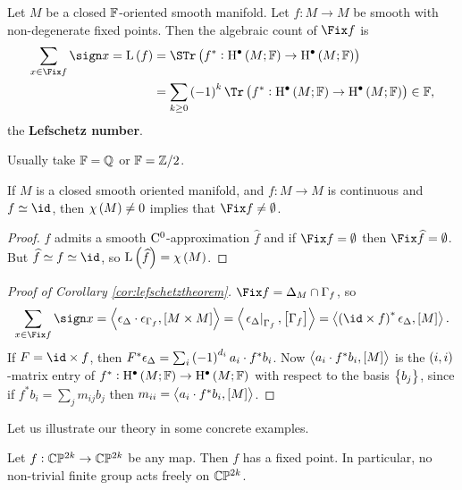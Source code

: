 \begin{corollary}
\label{cor:lefschetztheorem}
Let $ M $ be a closed $ \mathbb{F} $-oriented smooth manifold. Let $ f : M \to M $ be smooth with non-degenerate fixed points. Then the algebraic count of $ \Fix f $ is
\begin{align*}
\sum_{x \in \Fix f} \sign x
= \L\br{f}
& = \STr \br{f^* : \H^\bullet\br{M; \FF} \to \H^\bullet\br{M; \FF}} \\
& = \sum_{k \ge 0} \br{-1}^k\Tr \br{f^* : \H^\bullet\br{M; \FF} \to \H^\bullet\br{M; \FF}}
\in \FF,
\end{align*}
the \textbf{Lefschetz number}.
\end{corollary}

Usually take $ \mathbb{F} = \mathbb{Q} $ or $ \mathbb{F} = \mathbb{Z} / 2 $.

\begin{corollary}
If $ M $ is a closed smooth oriented manifold, and $ f : M \to M $ is continuous and $ f \simeq \id $, then $ \chi\br{M} \ne 0 $ implies that $ \Fix f \ne \emptyset $.
\end{corollary}

\begin{proof}
$ f $ admits a smooth $ \mathrm{C}^0 $-approximation $ \widehat{f} $ and if $ \Fix f = \emptyset $ then $ \Fix \widehat{f} = \emptyset $. But $ \widehat{f} \simeq f \simeq \id $, so $ \L\br{\widehat{f}} = \chi\br{M} $.
\end{proof}

\pagebreak

\begin{proof}[Proof of Corollary \ref{cor:lefschetztheorem}]
$ \Fix f = \Delta_M \cap \Gamma_f $, so
$$ \sum_{x \in \Fix f} \sign x = \abr{\epsilon_\Delta \cdot \epsilon_{\Gamma_f}, \sbr{M \times M}} = \abr{\eval{\epsilon_\Delta}_{\Gamma_f}, \sbr{\Gamma_f}} = \abr{\br{\id \times f}^*\epsilon_\Delta, \sbr{M}}. $$
If $ F = \id \times f $, then $ F^*\epsilon_\Delta = \sum_i \br{-1}^{d_i}a_i \cdot f^*b_i $. Now $ \abr{a_i \cdot f^*b_i, \sbr{M}} $ is the $ \br{i, i} $-matrix entry of $ f^* : \H^\bullet\br{M; \FF} \to \H^\bullet\br{M; \FF} $ with respect to the basis $ \cbr{b_j} $, since if $ f^*b_i = \sum_j m_{ij}b_j $ then $ m_{ii} = \abr{a_i \cdot f^*b_i, \sbr{M}} $.
\end{proof}


Let us illustrate our theory in some concrete examples.

\begin{corollary}
Let $ f : \mathbb{C}\mathbb{P}^{2k} \to \mathbb{C}\mathbb{P}^{2k} $ be any map. Then $ f $ has a fixed point. In particular, no non-trivial finite group acts freely on $ \mathbb{C}\mathbb{P}^{2k} $.
\end{corollary}

